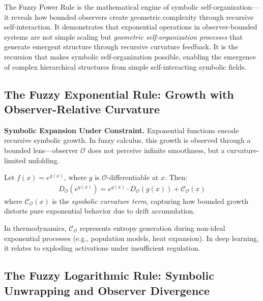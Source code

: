 The Fuzzy Power Rule is the mathematical engine of symbolic self-organization—it reveals how bounded observers create geometric complexity through recursive self-interaction. It demonstrates that exponential operations in observer-bounded systems are not simple scaling but \textit{geometric self-organization processes} that generate emergent structure through recursive curvature feedback. It is the recursion that makes symbolic self-organization possible, enabling the emergence of complex hierarchical structures from simple self-interacting symbolic fields.

\subsection{The Fuzzy Exponential Rule: Growth with Observer-Relative Curvature}
\label{subsec:bk4_fuzzy_exponential_rule}

\textbf{Symbolic Expansion Under Constraint.} Exponential functions encode recursive symbolic growth. In fuzzy calculus, this growth is observed through a bounded lens---observer $\mathcal{O}$ does not perceive infinite smoothness, but a curvature-limited unfolding.

\begin{theorem}
\label{theorem:bk4_fuzzy_exponential_rule}
Let $f(x) = e^{g(x)}$, where $g$ is $\mathcal{O}$-differentiable at $x$. Then:
\begin{align}
D_{\mathcal{O}}(e^{g(x)}) = e^{g(x)} \cdot D_{\mathcal{O}}(g(x)) + \mathcal{C}_{\mathcal{O}}(x)
\end{align}
where $\mathcal{C}_{\mathcal{O}}(x)$ is the \emph{symbolic curvature term}, capturing how bounded growth distorts pure exponential behavior due to drift accumulation.
\end{theorem}

\begin{scholium}
\label{scholium:bk4_fuzzy_exponential_growth}
In thermodynamics, $\mathcal{C}_{\mathcal{O}}$ represents entropy generation during non-ideal exponential processes (e.g., population models, heat expansion). In deep learning, it relates to exploding activations under insufficient regulation.
\end{scholium}

\subsection{The Fuzzy Logarithmic Rule: Symbolic Unwrapping and Observer Divergence}
\label{subsec:bk4_fuzzy_logarithmic_rule}

